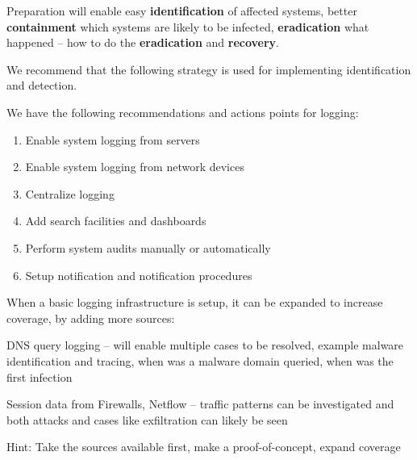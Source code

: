 \documentclass[Screen16to9,17pt]{foils}
\begin{document}
Preparation will enable easy {\bf identification} of affected systems, better {\bf containment} which systems are likely to be infected, {\bf eradication} what happened -- how to do the {\bf eradication} and {\bf recovery}.


We recommend that the following strategy is used for implementing identification and detection.

We have the following recommendations and actions points for logging:
\begin{enumerate}
\item[\faSquareO] Enable system logging from servers
\item[\faSquareO] Enable system logging from network devices
\item[\faSquareO] Centralize logging
\item[\faSquareO] Add search facilities and dashboards
\item[\faSquareO] Perform system audits manually or automatically
\item[\faSquareO] Setup notification and notification procedures
\end{enumerate}

When a basic logging infrastructure is setup, it can be expanded to increase coverage, by
adding more sources:

\begin{list2}
\item DNS query logging -- will enable multiple cases to be resolved, example malware identification and tracing, when was a malware domain queried, when was the first infection
\item Session data from Firewalls, Netflow -- traffic patterns can be investigated and both attacks and cases like exfiltration can likely be seen
\end{list2}

Hint: Take the sources available first, make a proof-of-concept, expand coverage

\end{document}

